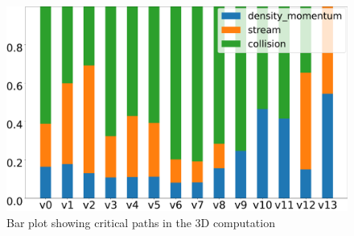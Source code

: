 \documentclass[letterpaper]{article}
\begin{document}
\begin{figure}[h!]
    \includegraphics[width=\linewidth]{fig/3D_artifacts/bar_plot_report.out.pdf}
    \caption{Bar plot showing critical paths in the 3D computation}
\end{figure}
\end{document}
